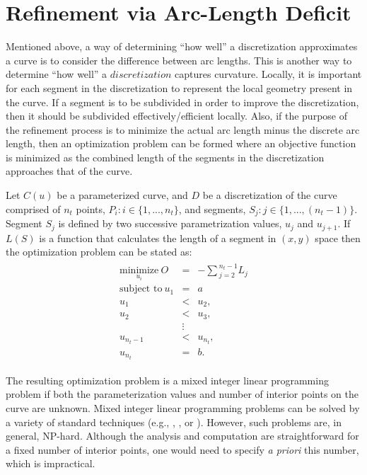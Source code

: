 \section{Refinement via Arc-Length Deficit}
Mentioned above, a way of determining ``how well'' a discretization 
approximates a curve is to consider the difference between arc lengths. 
This is another way to determine ``how well'' a $discretization$ captures curvature. Locally, it is important for each segment in the discretization to represent the local geometry present in the curve. If a segment is to be subdivided in order to improve the discretization, then it should be subdivided 
effectively/efficient locally.
Also, if the purpose of the refinement process is to minimize the actual 
arc length minus the discrete arc length, then an optimization problem can 
be formed where an objective function is minimized as the combined length of the segments in the discretization approaches that of the curve.

Let $C(u)$ be a parameterized curve, and $D$ be a discretization of the 
curve comprised of $n_t$ points, $P_i : i \in \{1,...,n_t\}$, and 
segments, $S_j : j \in \{1,...,(n_t-1)\}$. Segment $S_j$ is defined by two successive parametrization values, $u_j$ and $u_{j+1}$. If $L(S)$ is a function that calculates the length of a segment in $(x,y)$ space then the optimization problem can be stated as:
\begin{eqnarray*}
\begin{array}{rcl}
\underset{u_i}{\text{minimize}} \ O & = & -\sum{_{j=2}^{n_t-1}L_j} \\
\text{subject to} \ u_1 & = & a \\
u_1 & < & u_2, \\ 
u_2 & < & u_3, \\
& \vdots & \\
u_{n_t-1} & < & u_{n_t},\\ 
u_{n_t} & = & b.
\end{array}
\end{eqnarray*}

The resulting optimization problem is a mixed integer linear programming 
problem if both the parameterization values and number of interior points 
on the curve are unknown.  Mixed integer linear programming problems can 
be solved by a variety of standard techniques (e.g., \cite{minto}, 
\cite{mosek}, or \cite{symphony}).  However, such problems 
are, in general, NP-hard.  
Although the analysis and computation are straightforward for a fixed 
number of interior points, one would need to specify {\it{a priori}} this 
number, which is impractical.

